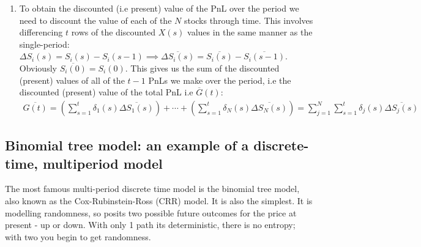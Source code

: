 \documentclass[9pt]{extarticle}
\begin{document}
\begin{enumerate}
  \item  To obtain the discounted (i.e present) value of the PnL over the period we need to discount the value 
  of each of the $N$ stocks through time. This involves differencing $t$ rows of the discounted $X(s)$ values in the same 
  manner as the single-period: $\Delta S_i(s) = S_i(s) - S_i(s-1) \implies \overline{\Delta S_i(s)} = \overline{S_i(s)} - \overline{S_i(s-1)}$. Obviously 
  $\overline{S_i(0)} = S_i(0)$. This gives us the sum of the discounted (present) values of all of the $t-1$ PnLs we make over the period, i.e the 
  discounted (present) value of the total PnL i.e $\overline{G}(t)$: 
  \begin{align}
    \overline{G(t)} =  \left(\sum_{s=1}^t \delta_1(s) \overline{\Delta S_1(s)}\right) + \cdots + \left(\sum_{s=1}^t \delta_N(s) \overline{\Delta S_N(s)}\right) = \sum_{j=1}^N \sum_{s=1}^t 
    \delta_j(s) \overline{\Delta S_j(s)}    
  \end{align}
\end{enumerate}

\subsection{Binomial tree model: an example of a discrete-time, multiperiod model}

The most famous multi-period discrete time model is the binomial tree model, also known as 
the Cox-Rubinstein-Ross (CRR) model. It is also the simplest. It is modelling randomness, so posits two possible 
future outcomes for the price at present - up or down. With only 1 path its deterministic, there is no entropy; with two you begin 
to get randomness. 
\end{document}
